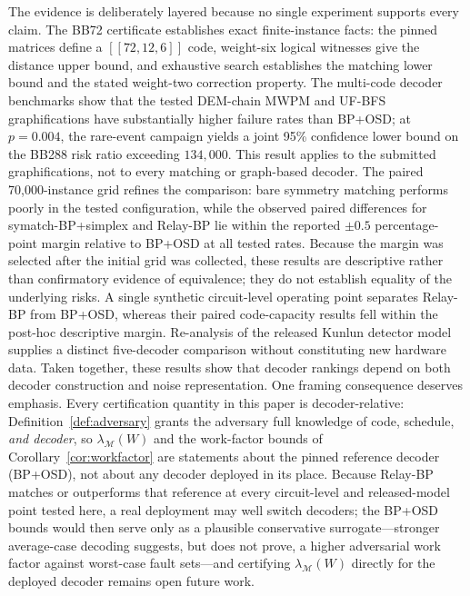 \documentclass[pdflatex,sn-mathphys-num]{sn-jnl}
\theoremstyle{thmstyleone}
\theoremstyle{thmstyletwo}
\theoremstyle{thmstylethree}
\begin{document}
The evidence is deliberately layered because no single experiment supports every claim. The BB72 certificate establishes exact finite-instance facts: the pinned matrices define a $[[72,12,6]]$ code, weight-six logical witnesses give the distance upper bound, and exhaustive search establishes the matching lower bound and the stated weight-two correction property. The multi-code decoder benchmarks show that the tested DEM-chain MWPM and UF-BFS graphifications have substantially higher failure rates than BP+OSD; at $p=0.004$, the rare-event campaign yields a joint 95\% confidence lower bound on the BB288 risk ratio exceeding $134{,}000$. This result applies to the submitted graphifications, not to every matching or graph-based decoder. The paired 70{,}000-instance grid refines the comparison: bare symmetry matching performs poorly in the tested configuration, while the observed paired differences for symatch-BP+simplex and Relay-BP lie within the reported $\pm0.5$ percentage-point margin relative to BP+OSD at all tested rates. Because the margin was selected after the initial grid was collected, these results are descriptive rather than confirmatory evidence of equivalence; they do not establish equality of the underlying risks. A single synthetic circuit-level operating point separates Relay-BP from BP+OSD, whereas their paired code-capacity results fell within the post-hoc descriptive margin. Re-analysis of the released Kunlun detector model supplies a distinct five-decoder comparison without constituting new hardware data. Taken together, these results show that decoder rankings depend on both decoder construction and noise representation. One framing consequence deserves emphasis. Every certification quantity in this paper is decoder-relative: Definition~\ref{def:adversary} grants the adversary full knowledge of code, schedule, \emph{and decoder}, so $\lambda_{\mathcal{M}}(W)$ and the work-factor bounds of Corollary~\ref{cor:workfactor} are statements about the pinned reference decoder (BP+OSD), not about any decoder deployed in its place. Because Relay-BP matches or outperforms that reference at every circuit-level and released-model point tested here, a real deployment may well switch decoders; the BP+OSD bounds would then serve only as a plausible conservative surrogate---stronger average-case decoding suggests, but does not prove, a higher adversarial work factor against worst-case fault sets---and certifying $\lambda_{\mathcal{M}}(W)$ directly for the deployed decoder remains open future work.
\end{document}
